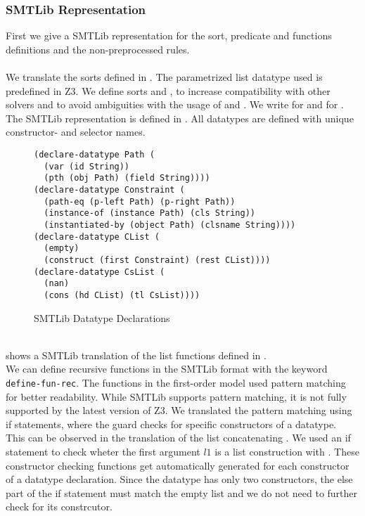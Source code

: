 \subsubsection{SMTLib Representation}
First we give a SMTLib representation for
the sort, predicate and functions definitions
and the non-preprocessed rules.\\
\\
We translate the sorts defined in .
The parametrized list datatype used is predefined in Z3.
We define sorts  and ,
to increase compatibility with other solvers
and to avoid ambiguities with the usage of \Constrs and \Constrss.
We write \Constrs for 
and \Constrss for .
The SMTLib representation is defined in .
All datatypes are defined with unique constructor- and selector names.
%
\begin{figure}[h]
\begin{lstlisting}[language=smtlib]
(declare-datatype Path (
  (var (id String))
  (pth (obj Path) (field String))))
(declare-datatype Constraint (
  (path-eq (p-left Path) (p-right Path))
  (instance-of (instance Path) (cls String))
  (instantiated-by (object Path) (clsname String))))
(declare-datatype CList (
  (empty)
  (construct (first Constraint) (rest CList))))
(declare-datatype CsList (
  (nan)
  (cons (hd CList) (tl CsList))))
\end{lstlisting}
\caption{SMTLib Datatype Declarations}
\label{fig:smtlib-sorts}
\end{figure}\\
%
 shows a SMTLib translation
of the list functions defined in .\\
We can define recursive functions in the SMTLib format
with the keyword \lstinline[language=smtlib]{define-fun-rec}.
The functions in the first-order model used pattern matching
for better readability. While SMTLib supports pattern matching,
it is not fully supported by the latest version of Z3.
We translated the pattern matching using if statements,
where the guard checks for specific constructors of a datatype.\\
This can be observed in the translation of the list concatenating .
We used an if statement to check wheter the first argument $l1$
is a list construction with .
These constructor checking functions get automatically
generated for each constructor of a datatype declaration.
Since the  datatype has only two constructors,
the else part of the if statement must match the empty list
and we do not need to further check for its constrcutor.

